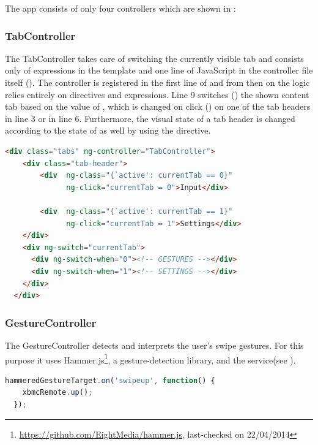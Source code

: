 The app consists of only four controllers which are shown in :

\subsubsection{TabController}

The TabController takes care of switching the currently visible tab and consists only of expressions in the template and one line of JavaScript in the controller file itself (). The controller is registered in the first line of  and from then on the logic relies entirely on directives and expressions. Line 9 switches () the shown content tab based on the value of , which is changed on click () on one of the tab headers in line 3 or in line 6. Furthermore, the visual state of a tab header is changed according to the state of  as well by using the  directive.

\begin{lstlisting}[language=HTML, caption=TabController expressions, label=lst:tab-controller]
  <div class="tabs" ng-controller="TabController">
    <div class="tab-header">
        <div  ng-class="{`active': currentTab == 0}"
              ng-click="currentTab = 0">Input</div>

        <div  ng-class="{`active': currentTab == 1}"
              ng-click="currentTab = 1">Settings</div>
    </div>
    <div ng-switch="currentTab">
      <div ng-switch-when="0"><!-- GESTURES --></div>
      <div ng-switch-when="1"><!-- SETTINGS --></div>
    </div>
  </div>
\end{lstlisting}

\subsubsection{GestureController}

The GestureController detects and interprets the user's swipe gestures. For this purpose it uses Hammer.js\footnote{\url{https://github.com/EightMedia/hammer.js}, last-checked on 22/04/2014}, a gesture-detection library, and the  service(see ).

\begin{lstlisting}[language=JavaScript, caption=GestureController mappings, label=lst:gesture-controller]
  hammeredGestureTarget.on('swipeup', function() {
    xbmcRemote.up();
  });
\end{lstlisting}


